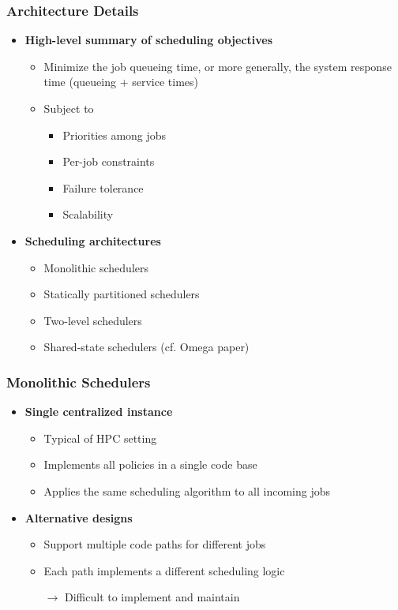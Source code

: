 \begin{frame}\frametitle{Architecture Details}
\begin{itemize}
	\item {\bf High-level summary of scheduling objectives}
	\begin{itemize}
		\item Minimize the job queueing time, or more generally, the system response time (queueing + service times)
		\item Subject to
		\begin{itemize}
			\item Priorities among jobs
			\item Per-job constraints
			\item Failure tolerance
			\item Scalability
		\end{itemize}
	\end{itemize}

\vspace{20pt}

	\item {\bf Scheduling architectures}
	\begin{itemize}
		\item Monolithic schedulers
		\item Statically partitioned schedulers
		\item Two-level schedulers
		\item Shared-state schedulers (cf. Omega paper)
	\end{itemize}
\end{itemize}
\end{frame}

\begin{frame}\frametitle{Monolithic Schedulers}
\begin{itemize}
	\item {\bf Single centralized instance}
	\begin{itemize}
		\item Typical of HPC setting
		\item Implements all policies in a single code base
		\item Applies the same scheduling algorithm to all incoming jobs
	\end{itemize}

\vspace{20pt}

	\item {\bf Alternative designs}
	\begin{itemize}
		\item Support multiple code paths for different jobs
		\item Each path implements a different scheduling logic
		\item[$\to$] Difficult to implement and maintain
	\end{itemize}
\end{itemize}
\end{frame}

